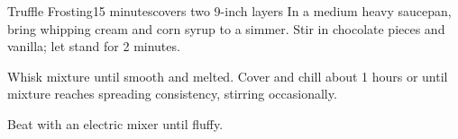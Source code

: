 \begin{recipe}{Truffle Frosting}{15 minutes}{covers two 9-inch layers}
In a medium heavy saucepan, bring whipping cream and corn syrup to a simmer.
Stir in chocolate pieces and vanilla; let stand for 2 minutes.\newstep

Whisk mixture until smooth and melted. Cover and chill about 1 hours or
until mixture reaches spreading consistency, stirring occasionally.\newstep

Beat with an electric mixer until fluffy.

\end{recipe}

